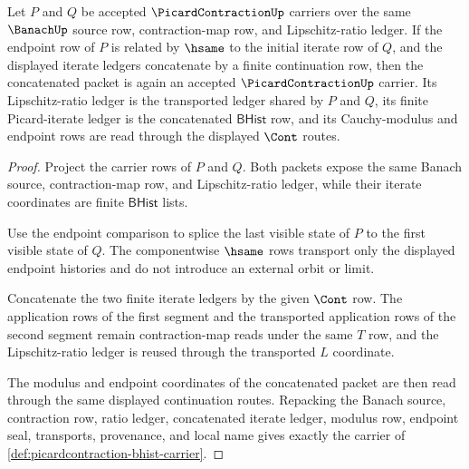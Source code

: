 \begin{theorem}
\label{thm:picardcontraction-finite-iterate-closure}
Let $P$ and $Q$ be accepted $\PicardContractionUp$ carriers over the same
$\BanachUp$ source row, contraction-map row, and Lipschitz-ratio ledger. If
the endpoint row of $P$ is related by $\hsame$ to the initial iterate row of
$Q$, and the displayed iterate ledgers concatenate by a finite continuation
row, then the concatenated packet is again an accepted
$\PicardContractionUp$ carrier. Its Lipschitz-ratio ledger is the transported
ledger shared by $P$ and $Q$, its finite Picard-iterate ledger is the
concatenated $\mathsf{BHist}$ row, and its Cauchy-modulus and endpoint rows
are read through the displayed $\Cont$ routes.
\end{theorem}
\begin{proof}
Project the carrier rows of $P$ and $Q$. Both packets expose the same
Banach source, contraction-map row, and Lipschitz-ratio ledger, while their
iterate coordinates are finite $\mathsf{BHist}$ lists.

Use the endpoint comparison to splice the last visible state of $P$ to the
first visible state of $Q$. The componentwise $\hsame$ rows transport only the
displayed endpoint histories and do not introduce an external orbit or limit.

Concatenate the two finite iterate ledgers by the given $\Cont$ row. The
application rows of the first segment and the transported application rows of
the second segment remain contraction-map reads under the same $T$ row, and
the Lipschitz-ratio ledger is reused through the transported $L$ coordinate.

The modulus and endpoint coordinates of the concatenated packet are then
read through the same displayed continuation routes. Repacking the Banach
source, contraction row, ratio ledger, concatenated iterate ledger, modulus
row, endpoint seal, transports, provenance, and local name gives exactly the
carrier of \autoref{def:picardcontraction-bhist-carrier}.
\end{proof}


